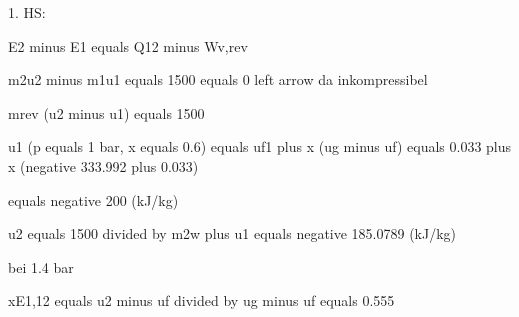 1. HS:

E2 minus E1 equals Q12 minus Wv,rev

m2u2 minus m1u1 equals 1500 equals 0 left arrow da inkompressibel

mrev (u2 minus u1) equals 1500

u1 (p equals 1 bar, x equals 0.6) equals uf1 plus x (ug minus uf) equals 0.033 plus x (negative 333.992 plus 0.033)

equals negative 200 (kJ/kg)

u2 equals 1500 divided by m2w plus u1 equals negative 185.0789 (kJ/kg)

bei 1.4 bar

xE1,12 equals u2 minus uf divided by ug minus uf equals 0.555